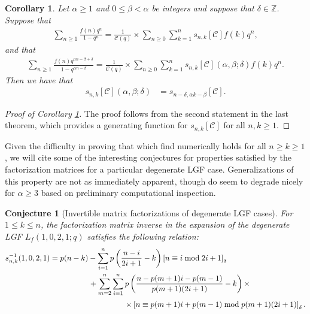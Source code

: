 \documentclass[12pt,reqno,a4letter]{article}
\numberwithin{figure}{section}
\numberwithin{table}{section}
\numberwithin{equation}{section}
\newcommand{\Iverson}[1]{\ensuremath{\left[#1\right]_{\delta}}}
\theoremstyle{plain}
\newtheorem{conjecture}[theorem]{Conjecture}
\newtheorem{cor}[theorem]{Corollary}
\numberwithin{theorem}{section}
\theoremstyle{definition}
\begin{document}
\begin{cor} 
\label{cor_ConsequenceOfThm1_ConnectionBetweenOrdFactThms} 
Let $\alpha \geq 1$ and $0 \leq \beta < \alpha$ be integers and suppose that $\delta \in \mathbb{Z}$. 
Suppose that 
\begin{align*} 
\sum_{n \geq 1} \frac{f(n) q^{n}}{1-q^{n}} = 
     \frac{1}{\mathcal{C}(q)} \times \sum_{n \geq 0} 
     \sum_{k=1}^n s_{n,k}[\mathcal{C}] f(k) q^n, 
\end{align*} 
and that 
\begin{align*} 
\sum_{n \geq 1} \frac{f(n) q^{\alpha n-\beta+\delta}}{1-q^{\alpha n-\beta}} = 
     \frac{1}{\mathcal{C}(q)} \times \sum_{n \geq 0} \sum_{k=1}^n s_{n,k}[\mathcal{C}](\alpha, \beta; \delta) 
     f(k) q^n. 
\end{align*} 
Then we have that 
\begin{align*} 
s_{n,k}[\mathcal{C}](\alpha, \beta; \delta) & = s_{n-\delta,\alpha k-\beta}[\mathcal{C}]. 
\end{align*} 
\end{cor} 
\begin{proof}[Proof of Corollary \ref{cor_ConsequenceOfThm1_ConnectionBetweenOrdFactThms}]
The proof follows from the second statement in the last theorem, which 
provides a generating function for $s_{n,k}[\mathcal{C}]$ for all $n, k \geq 1$. 
\end{proof}

Given the difficulty in proving that which find numerically 
holds for all $n \geq k \geq 1$, we will cite some of the interesting conjectures for properties 
satisfied by the factorization matrices for a particular degenerate LGF case. 
Generalizations of this property are not as immediately apparent, though do seem to degrade nicely 
for $\alpha \geq 3$ based on preliminary computational inspection. 

\begin{conjecture}[Invertible matrix factorizations of degenerate LGF cases]
For $1 \leq k \leq n$, the factorization matrix inverse in the expansion of the degenerate LGF 
$L_f(1, 0, 2, 1; q)$ satisfies the following relation:
\begin{align} 
\label{eqn_DegenCasesOfThm_example_v1}
s_{n,k}^{-1}(1, 0, 2, 1) & = 
     p(n-k) - \sum_{i=1}^n p\left(\frac{n-i}{2i+1}-k\right) \Iverson{n \equiv i \bmod 2i+1} \\ 
\notag 
     & \phantom{=p(n-k)\ } + 
     \sum_{m=2}^n \sum_{i=1}^n p\left(\frac{n-p(m+1)i-p(m-1)}{p(m+1)(2i+1)} - k\right) \times \\ 
\notag
     & \phantom{=p(n-k)+\sum\sum\ \ } \times 
     \Iverson{n \equiv p(m+1)i+p(m-1) \bmod p(m+1)(2i+1)}. 
\end{align} 
\end{conjecture} 
\end{document}
